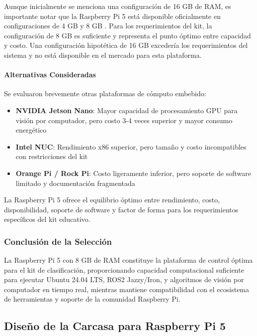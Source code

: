 Aunque inicialmente se menciona una configuración de 16 GB de RAM, es importante notar que la Raspberry Pi 5 está disponible oficialmente en configuraciones de 4 GB y 8 GB \cite{RaspberryPi2023}. Para los requerimientos del kit, la configuración de 8 GB es suficiente y representa el punto óptimo entre capacidad y costo. Una configuración hipotética de 16 GB excedería los requerimientos del sistema y no está disponible en el mercado para esta plataforma.

\paragraph{Alternativas Consideradas}

Se evaluaron brevemente otras plataformas de cómputo embebido:

\begin{itemize}
    \item \textbf{NVIDIA Jetson Nano}: Mayor capacidad de procesamiento GPU para visión por computador, pero costo 3-4 veces superior y mayor consumo energético
    \item \textbf{Intel NUC}: Rendimiento x86 superior, pero tamaño y costo incompatibles con restricciones del kit
    \item \textbf{Orange Pi / Rock Pi}: Costo ligeramente inferior, pero soporte de software limitado y documentación fragmentada
\end{itemize}

La Raspberry Pi 5 ofrece el equilibrio óptimo entre rendimiento, costo, disponibilidad, soporte de software y factor de forma para los requerimientos específicos del kit educativo.

\subsubsection{Conclusión de la Selección}

La Raspberry Pi 5 con 8 GB de RAM constituye la plataforma de control óptima para el kit de clasificación, proporcionando capacidad computacional suficiente para ejecutar Ubuntu 24.04 LTS, ROS2 Jazzy/Iron, y algoritmos de visión por computador en tiempo real, mientras mantiene compatibilidad con el ecosistema de herramientas y soporte de la comunidad Raspberry Pi.

\subsection{Diseño de la Carcasa para Raspberry Pi 5}

